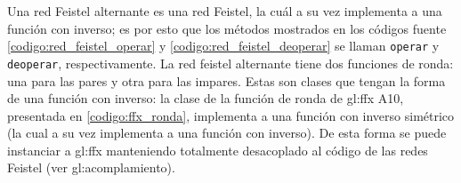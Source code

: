 Una red Feistel alternante es una red Feistel, la cuál a su vez implementa a
una función con inverso; es por esto que los métodos mostrados en los códigos
fuente \ref{codigo:red_feistel_operar} y \ref{codigo:red_feistel_deoperar} se
llaman \texttt{operar} y \texttt{deoperar}, respectivamente. La red feistel
alternante tiene dos funciones de  ronda: una para las pares y otra para las
impares. Estas son clases que  tengan la forma de una función con inverso: la
clase de la función de ronda de \gls{gl:ffx} A10, presentada en
\ref{codigo:ffx_ronda}, implementa a una función con inverso simétrico (la cual
a su vez implementa a una función con inverso). De esta forma se puede
instanciar a \gls{gl:ffx} manteniendo totalmente desacoplado al código de las
redes Feistel (ver \gls{gl:acomplamiento}).

